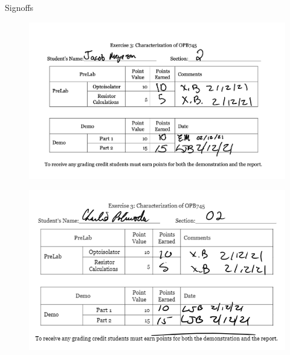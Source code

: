 \documentclass{article}
\begin{document}
\centering
\huge{Signoffs}
\begin{figure}[H]
	\centering
  	\includegraphics[width=1.00\textwidth]{Screenshots/Signoff_jm}  
\end{figure}

\begin{figure}[H]
	\centering
  	\includegraphics[width=1.00\textwidth]{Screenshots/Signoff_cp}  
\end{figure}
\end{document}
